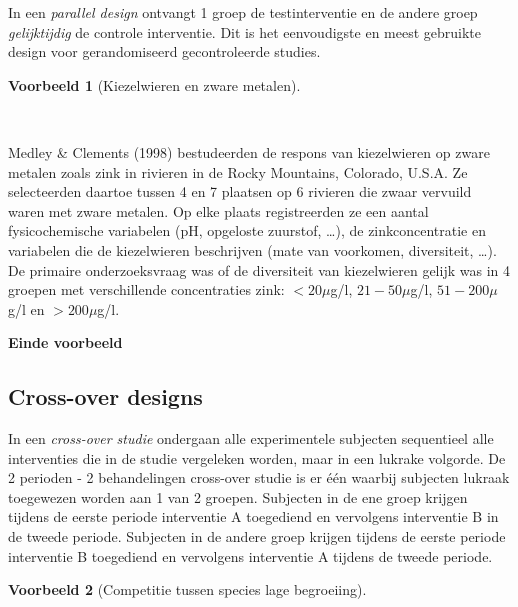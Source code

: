 \documentclass[
  dutch,
  letterpaper,
  12pt]{book}
\theoremstyle{definition}
\theoremstyle{definition}
\theoremstyle{definition}
\newtheorem{example}{Voorbeeld}[chapter]
\theoremstyle{remark}
\begin{document}
In een \emph{parallel design} ontvangt 1 groep de testinterventie en de
andere groep \emph{gelijktijdig} de controle interventie. Dit is het
eenvoudigste en meest gebruikte design voor gerandomiseerd
gecontroleerde studies.

\begin{example}[Kiezelwieren en zware
metalen]\protect\hypertarget{exm-kiezelwieren-en-zware-metalen}{}\label{exm-kiezelwieren-en-zware-metalen}

~

\end{example}

Medley \& Clements (1998) bestudeerden de respons van kiezelwieren op
zware metalen zoals zink in rivieren in de Rocky Mountains, Colorado,
U.S.A. Ze selecteerden daartoe tussen 4 en 7 plaatsen op 6 rivieren die
zwaar vervuild waren met zware metalen. Op elke plaats registreerden ze
een aantal fysicochemische variabelen (pH, opgeloste zuurstof, \ldots),
de zinkconcentratie en variabelen die de kiezelwieren beschrijven (mate
van voorkomen, diversiteit, \ldots). De primaire onderzoeksvraag was of
de diversiteit van kiezelwieren gelijk was in 4 groepen met
verschillende concentraties zink: \(<20 \mu\)g/l, \(21-50 \mu\)g/l,
\(51-200 \mu\)g/l en \(>200 \mu\)g/l.

\textbf{Einde voorbeeld}

\subsection{Cross-over designs}\label{cross-over-designs}

In een \emph{cross-over studie} ondergaan alle experimentele subjecten
sequentieel alle interventies die in de studie vergeleken worden, maar
in een lukrake volgorde. De 2 perioden - 2 behandelingen cross-over
studie is er één waarbij subjecten lukraak toegewezen worden aan 1 van 2
groepen. Subjecten in de ene groep krijgen tijdens de eerste periode
interventie A toegediend en vervolgens interventie B in de tweede
periode. Subjecten in de andere groep krijgen tijdens de eerste periode
interventie B toegediend en vervolgens interventie A tijdens de tweede
periode.

\begin{example}[Competitie tussen species lage
begroeiing]\protect\hypertarget{exm-competitie-tussen-species-lage-begroeiing}{}\label{exm-competitie-tussen-species-lage-begroeiing}

~

\end{example}
\end{document}
